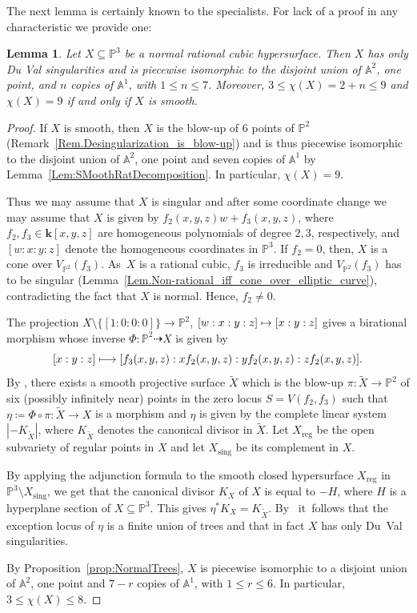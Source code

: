 \documentclass[JEP,XML,SOM,Unicode,NoFloatCountersInSection,published]{cedram}
\newcommand\mto{\mathchoice{\longmapsto}{\mapsto}{\mapsto}{\mapsto}}
\newtheorem{lemma}{Lemma}[section]
\theoremstyle{definition}
\newcommand\A{{\mathbb A}}\let\AA\A
\newcommand\p{{\mathbb P}}\let\PP\p
\newcommand{\kk}{\mathbf{k}}
\DeclareMathOperator{\sing}{sing}
\DeclareMathOperator{\reg}{reg}
\begin{document}
The next lemma is certainly known to the specialists. For lack of a proof in any characteristic we provide one:

\begin{lemma}
\label{Lem.Normal_cubic_surf}
Let $X \subseteq \PP^3$ be a normal rational cubic hypersurface.
Then $X$ has only Du Val singularities and is piecewise isomorphic to the disjoint union of $\A^2$, one point, and $n$ copies of $\A^1$, with $1\le n\le 7$. Moreover, $3 \leq \chi(X) = 2 + n \leq 9$
and $\chi(X) = 9$ if and only if $X$ is smooth.
\end{lemma}

\begin{proof}
If $X$ is smooth, then $X$ is the blow-up of $6$ points of $\p^2$ (Remark~\ref{Rem.Desingularization_is_blow-up}) and is thus piecewise isomorphic to the disjoint
union of $\AA^2$, one point and seven copies of $\AA^1$ by Lemma~\ref{Lem:SMoothRatDecomposition}.
In particular, $\chi(X)=9$.

Thus we may assume that $X$ is singular and after some coordinate change we may assume that $X$ is given by
$f_2(x, y, z)w + f_3(x, y, z)$, where
$f_2, f_3 \in \kk[x, y, z]$ are homogeneous polynomials of degree $2, 3$, respectively,
and $[w:x:y:z]$ denote the homogeneous coordinates in $\PP^3$. If $f_2 = 0$, then,
$X$ is a cone over $V_{\p^2}(f_3)$. As~$X$ is a rational cubic, $f_3$ is irreducible and $V_{\p^2}(f_3)$ has to be singular (Lemma~\ref{Lem.Non-rational_iff_cone_over_elliptic_curve}), contradicting the fact that $X$ is normal.
Hence, $f_2 \neq 0$.

The projection $X \setminus \{[1:0:0:0] \} \to \PP^2$, $[w:x:y:z] \mto [x:y:z]$
gives a birational morphism
whose inverse $\Phi \colon \PP^2 \dashrightarrow X$ is given by
\[
[x:y:z]\mto [f_3(x,y,z): x f_2(x,y,z): y f_2(x,y,z): z f_2(x,y,z)].
\]
By \cite[Prop.\,1.5]{Sakamaki:2010vx}, there exists a smooth projective surface $\tilde{X}$ which
is the blow-up $\pi \colon \tilde{X} \to \PP^2$ of six (possibly infinitely near) points
in the zero locus $S = V(f_2, f_3)$ such that $\eta \coloneqq \Phi \circ \pi \colon \tilde{X} \to X$ is a morphism
and $\eta$ is given by the complete linear system
$|-K_{\tilde{X}}|$, where $K_{\tilde{X}}$ denotes the canonical divisor in $\tilde{X}$.
Let $X_{\reg}$ be the open subvariety of regular points in $X$ and let $X_{\sing}$ be its complement in $X$.

By applying the adjunction formula to the smooth closed hypersurface $X_{\reg}$ in $\PP^3 \setminus X_{\sing}$,
we get that the canonical divisor $K_X$ of $X$ is equal to $-H$, where $H$ is a hyperplane section of $X\subseteq \p^3$.
This gives $\eta^{\ast} K_X = K_{\tilde{X}}$.
By~\cite[Th.\,2.7]{Ar1962Some-numerical-cri} it~follows that the exception locus of $\eta$
is a finite union of trees and that in fact $X$ has only Du~Val singularities.

By Proposition~\ref{prop:NormalTrees}, $X$ is piecewise isomorphic to a disjoint
union of $\AA^2$, one point and $7-r$ copies of $\AA^1$, with $1\le r\le 6$.
In particular, $3\le \chi(X) \le 8$.
\end{proof}
\end{document}
